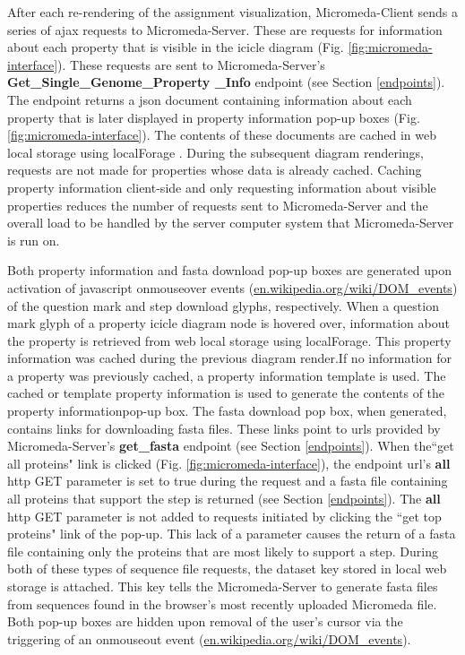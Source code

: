 After each re-rendering of the assignment visualization, Micromeda-Client sends 
a series of \gls{ajax} requests to Micromeda-Server. These are requests for 
information about each property that is visible in the icicle diagram (Fig. 
\ref{fig:micromeda-interface}). These requests are sent to Micromeda-Server's 
\textbf{Get\_Single\_Genome\_Property \_Info} endpoint (see Section 
\ref{endpoints}). The endpoint returns a \gls{json} document containing 
information about each property that is later displayed in property information 
pop-up boxes (Fig. \ref{fig:micromeda-interface}). The contents of these 
documents are cached in web local storage using localForage \cite{localforage}. 
During the subsequent diagram renderings, requests are not made for properties 
whose data is already cached. Caching property information client-side and only 
requesting information about visible properties reduces the number of requests 
sent to Micromeda-Server and the overall load to be handled by the server 
computer system that Micromeda-Server is run on.

Both property information and \gls{fasta} download pop-up boxes are generated 
upon activation of \gls{javascript} onmouseover events \cite{dom-events} 
(\href{http://en.wikipedia.org/wiki/DOM_events}{en.wikipedia.org/wiki/DOM\_events}) 
of the question mark and step download glyphs, respectively. When a question 
mark glyph of a property icicle diagram node is hovered over, information about 
the property is retrieved from web local storage using localForage. This 
property information was cached during the previous diagram render.If no 
information for a property was previously cached, a property information 
template is used. The cached or template property information is used to 
generate the contents of the property informationpop-up box. The \gls{fasta} 
download pop box, when generated, contains links for downloading \gls{fasta} 
files. These links point to \gls{url}s provided by Micromeda-Server's 
\textbf{get\_fasta} endpoint (see Section \ref{endpoints}). When the``get all 
proteins" link is clicked (Fig. \ref{fig:micromeda-interface}), the endpoint 
\gls{url}'s \textbf{all} \gls{http} GET parameter is set to true during the 
request and a \gls{fasta} file containing all proteins that support the step is 
returned (see Section \ref{endpoints}). The \textbf{all} \gls{http} GET 
parameter is not added to requests initiated by clicking the ``get top proteins" 
link of the pop-up. This lack of a parameter causes the return of a \gls{fasta} 
file containing only the proteins that are most likely to support a step. During 
both of these types of sequence file requests, the dataset key stored in local 
web storage is attached. This key tells the Micromeda-Server to generate 
\gls{fasta} files from sequences found in the browser's most recently uploaded 
Micromeda file. Both pop-up boxes are hidden upon removal of the user's cursor 
via the triggering of an onmouseout event \cite{dom-events} 
(\href{http://en.wikipedia.org/wiki/DOM_events}{en.wikipedia.org/wiki/DOM\_events}).

